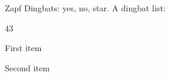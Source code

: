 \documentclass{article}
\begin{document}
Zapf Dingbats:  yes,  no,  star.
A dingbat list:
\begin{dinglist}{43}
\item First item
\item Second item
\end{dinglist}
\end{document}
